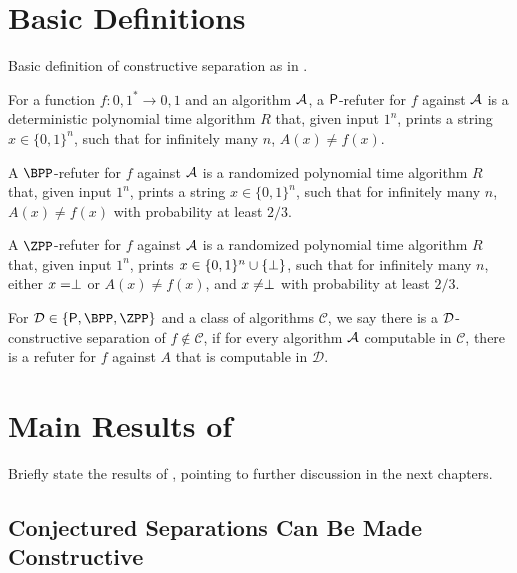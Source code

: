
\section{Basic Definitions}

Basic definition of constructive separation as in \cite{ConstructiveSeparations}.

\begin{definition}
	\label{def:refuter}
	For a function $f \colon {0, 1}^* \to {0, 1}$ and an algorithm $\mathcal{A}$, 
	a $\mathsf{P}$-refuter for $f$ against $\mathcal{A}$ is a deterministic polynomial time
	algorithm $R$ that, given input $1^n$, prints a string $x \in \{0, 1\}^n$,
	such that for infinitely many $n$, $A(x) \neq f(x)$.
	
	A $\BPP$-refuter for $f$ against $\mathcal{A}$ is a randomized polynomial time algorithm
	$R$ that, given input $1^n$, prints a string $x \in \{0, 1\}^n$, such that 
	for infinitely many $n$, $A(x) \neq f(x)$ with probability at least $2/3$.

	A $\ZPP$-refuter for $f$ against $\mathcal{A}$ is a randomized polynomial time algorithm $R$
	that, given input $1^n$, prints $x \in \{0, 1\}^n \cup \{\perp\}$, such that for 
	infinitely many $n$, either $x = \perp$ or $A(x) \neq f(x)$, and $x \neq \perp$ with
	probability at least $2/3$. 
\end{definition}

\begin{definition}
	\label{def:constructiveseparation}
	For $\calD \in \{\PTIME, \BPP, \ZPP\}$ and a class of algorithms $\mathcal{C}$, we say there is a 
	$\mathcal{D}$-constructive separation of $f \not\in \mathcal{C}$, if for every algorithm $\mathcal{A}$ computable
	in $\mathcal{C}$, there is a refuter for $f$ against $A$ that is computable in $\mathcal{D}$. 
\end{definition}

\section{Main Results of \cite{ConstructiveSeparations}}

Briefly state the results of \cite{ConstructiveSeparations}, pointing to further discussion in the next chapters. 

\subsection{Conjectured Separations Can Be Made Constructive}

